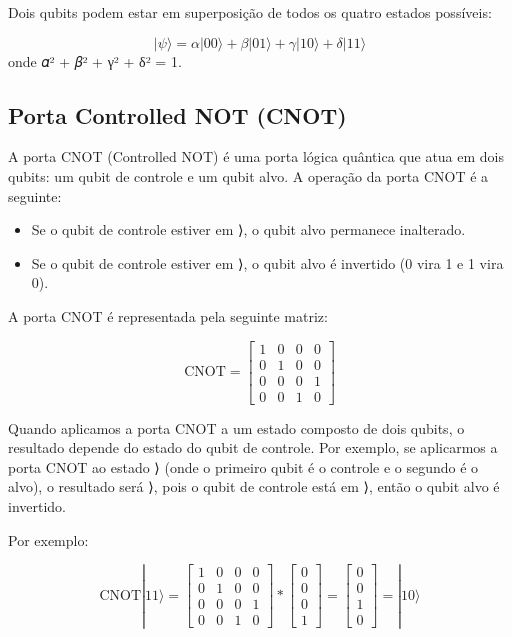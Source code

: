 \documentclass[
  brazilian,
]{report}
\providecommand{\tightlist}{%
  \setlength{\itemsep}{0pt}\setlength{\parskip}{0pt}}
\begin{document}
Dois qubits podem estar em superposição de todos os quatro estados
possíveis:

\[|\psi\rangle = 𝛼|00\rangle + 𝛽|01\rangle + γ|10\rangle + δ|11\rangle\]
onde \textbar 𝛼\textbar² + \textbar 𝛽\textbar² + \textbar γ\textbar² +
\textbar δ\textbar² = 1.

\subsection{Porta Controlled NOT
(CNOT)}\label{porta-controlled-not-cnot}

A porta CNOT (Controlled NOT) é uma porta lógica quântica que atua em
dois qubits: um qubit de controle e um qubit alvo. A operação da porta
CNOT é a seguinte:

\begin{itemize}
\tightlist
\item
  Se o qubit de controle estiver em ⟩, o qubit alvo permanece
  inalterado.
\item
  Se o qubit de controle estiver em ⟩, o qubit alvo é invertido
  (0 vira 1 e 1 vira 0).
\end{itemize}

A porta CNOT é representada pela seguinte matriz:

\[\text{CNOT} = \begin{bmatrix} 1 & 0 & 0 & 0 \\ 0 & 1 & 0 & 0 \\ 0 & 0 & 0 & 1 \\ 0 & 0 & 1 & 0 \end{bmatrix}\]

Quando aplicamos a porta CNOT a um estado composto de dois qubits, o
resultado depende do estado do qubit de controle. Por exemplo, se
aplicarmos a porta CNOT ao estado ⟩ (onde o primeiro qubit é o
controle e o segundo é o alvo), o resultado será ⟩, pois o
qubit de controle está em ⟩, então o qubit alvo é invertido.

Por exemplo:

\[\text{CNOT}|11⟩ = \begin{bmatrix} 1 & 0 & 0 & 0 \\ 0 & 1 & 0 & 0 \\ 0 & 0 & 0 & 1 \\ 0 & 0 & 1 & 0 \end{bmatrix} * \begin{bmatrix} 0 \\ 0 \\ 0 \\ 1 \end{bmatrix} = \begin{bmatrix} 0 \\ 0 \\ 1 \\ 0 \end{bmatrix} = |10⟩\]
\end{document}
